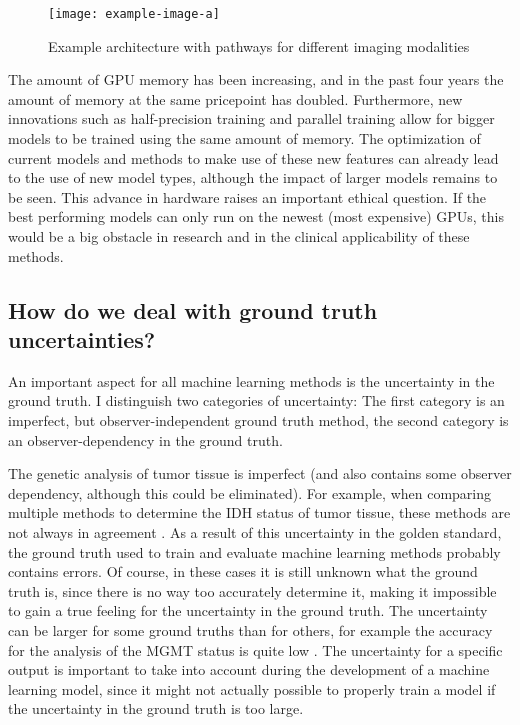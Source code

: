 \begin{figure}
\texttt{[image: example-image-a]}
\caption{Example architecture with pathways for different imaging modalities}\label{fig:discussion_architecture}
\end{figure}

The amount of GPU memory has been increasing, and in the past four years the amount of memory at the same pricepoint has doubled.
Furthermore, new innovations such as half-precision training and parallel training allow for bigger models to be trained using the same amount of memory.
The optimization of current models and methods to make use of these new features can already lead to the use of new model types, although the impact of larger models remains to be seen.
This advance in hardware raises an important ethical question.
If the best performing models can only run on the newest (most expensive) GPUs, this would be a big obstacle in research and in the clinical applicability of these methods.


\subsection{How do we deal with ground truth uncertainties?}

An important aspect for all machine learning methods is the uncertainty in the ground truth.
I distinguish two categories of uncertainty: The first category is an imperfect, but observer-independent ground truth method, the second category is an observer-dependency in the ground truth.

The genetic analysis of tumor tissue is imperfect (and also contains some observer dependency, although this could be eliminated).
For example, when comparing multiple methods to determine the \gls{IDH} status of \gls{tumor} tissue, these methods are not always in agreement \autocite{pyo2016concordance}.
As a result of this uncertainty in the golden standard, the ground truth used to train and evaluate machine learning methods probably contains errors.
Of course, in these cases it is still unknown what the  ground truth is, since there is no way too  accurately determine it, making it impossible to gain a true feeling for the uncertainty in the ground truth.
The uncertainty can be larger for some ground truths than for others, for example the accuracy for the analysis of the \gls{MGMT} status is quite low \autocite{wang2017mgmt}.
The uncertainty for a specific output is important to take into account during the development of a machine learning model, since it might not actually possible to properly train a model if the uncertainty in the ground truth is too large.

